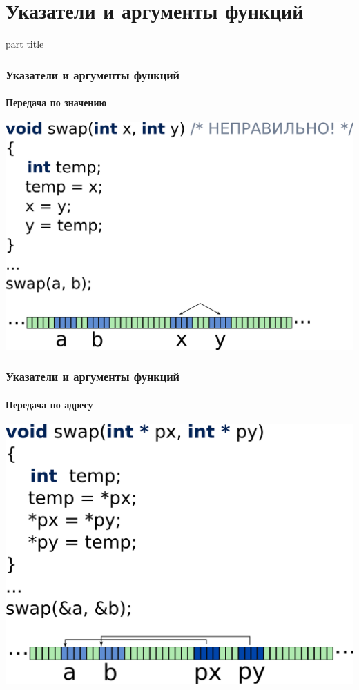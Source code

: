 \documentclass[14pt,pdf,hyperref={unicode}]{beamer}
\begin{document}
\section{Указатели и аргументы функций}
\begin{frame}
\begin{center}
\begin{beamercolorbox}[sep=8pt,center]{part
title}
\insertsection
\end{beamercolorbox}
\end{center}
\end{frame}

\begin{frame}[fragile]
\frametitle{Указатели и аргументы функций} 
\framesubtitle{Передача по значению}
\begin{center}
\includegraphics[height=0.55\linewidth]{images/swap_wrong.png}
\end{center}
\end{frame}

\begin{frame}[fragile]
\frametitle{Указатели и аргументы функций} 
\framesubtitle{Передача по адресу}
\begin{center}
\includegraphics[height=0.55\linewidth]{images/swap_right.png}
\end{center}
\end{frame}
\end{document}
